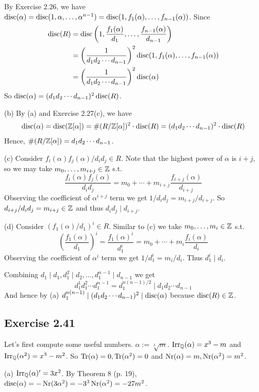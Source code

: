 \documentclass[../Marcus.tex]{subfiles}
\begin{document}
By Exercise 2.26, we have $\operatorname{disc}(\alpha)=\operatorname{disc}(1,\alpha,\ldots,\alpha^{n-1})=\operatorname{disc}(1,f_1(\alpha),\ldots,f_{n-1}(\alpha))$. Since 
\begin{align*}
    \operatorname{disc}(R) &= \operatorname{disc}\left(1,\frac{f_1(\alpha)}{d_1},\ldots,\frac{f_{n-1}(\alpha)}{d_{n-1}}\right) \\
    &= \left(\frac{1}{d_1d_2\cdots d_{n-1}}\right)^2\operatorname{disc}(1,f_1(\alpha),\ldots,f_{n-1}(\alpha)) \\ 
    &= \left(\frac{1}{d_1d_2\cdots d_{n-1}}\right)^2\operatorname{disc}(\alpha)
\end{align*}
So $\operatorname{disc}(\alpha)=(d_1d_2\cdots d_{n-1})^2\operatorname{disc}(R)$.

(b) By (a) and Exercise 2.27(c), we have
\begin{align*}
    \operatorname{disc}(\alpha)=\operatorname{disc}(\mathbb{Z}[\alpha])=\#(R/\mathbb{Z}[\alpha])^2\cdot\operatorname{disc}(R)=(d_1d_2\cdots d_{n-1})^2\cdot\operatorname{disc}(R)
\end{align*}
Hence, $\#(R/\mathbb{Z}[\alpha])=d_1d_2\cdots d_{n-1}$.

(c) Consider $f_i(\alpha)f_j(\alpha)/d_id_j\in R$. Note that the highest power of $\alpha$ is $i+j$, so we may take $m_0,\ldots,m_{i+j}\in\mathbb{Z}$ s.t. $$\frac{f_i(\alpha)f_j(\alpha)}{d_id_j}=m_0+\cdots+m_{i+j}\frac{f_{i+j}(\alpha)}{d_{i+j}}$$ Observing the coefficient of $\alpha^{i+j}$ term we get $1/d_id_j=m_{i+j}/d_{i+j}$. So $d_{i+j}/d_id_j=m_{i+j}\in\mathbb{Z}$ and thus $d_id_j\mid d_{i+j}$.

(d) Consider $(f_1(\alpha)/d_1)^i\in R$. Similar to (c) we take $m_0,\ldots,m_i\in\mathbb{Z}$ s.t. $$\left(\frac{f_1(\alpha)}{d_1}\right)^i=\frac{f_1(\alpha)^i}{d_1^i}=m_0+\cdots+m_i\frac{f_i(\alpha)}{d_i}$$ Observing the coefficient of $\alpha^i$ term we get $1/d_1^i=m_i/d_i$. Thus $d_1^i\mid d_i$.

Combining $d_1\mid d_1,d_1^2\mid d_2,\ldots,d_1^{n-1}\mid d_{n-1}$ we get $$d_1^1d_1^2\cdots d_1^{n-1}=d_1^{n(n-1)/2}\mid d_1d_2\cdots d_{n-1}$$ And hence by (a) $d_1^{n(n-1)}\mid (d_1d_2\cdots d_{n-1})^2\mid \operatorname{disc}(\alpha)$ because $\operatorname{disc}(R)\in\mathbb{Z}$.

\subsection*{Exercise 2.41}

Let's first compute some useful numbers. $\alpha:=\sqrt[3]{m}$. $\operatorname{Irr}_{\mathbb{Q}}(\alpha)=x^3-m$ and $\operatorname{Irr}_{\mathbb{Q}}(\alpha^2)=x^3-m^2$. So $\operatorname{Tr}(\alpha)=0,\operatorname{Tr}(\alpha^2)=0$ and $\operatorname{Nr}(\alpha)=m,\operatorname{Nr}(\alpha^2)=m^2$.

(a) $\operatorname{Irr}_{\mathbb{Q}}(\alpha)'=3x^2$. By Theorem 8 (p. 19), $\operatorname{disc}(\alpha)=-\operatorname{Nr}(3\alpha^2)=-3^3\operatorname{Nr}(\alpha^2)=-27m^2$.
\end{document}

